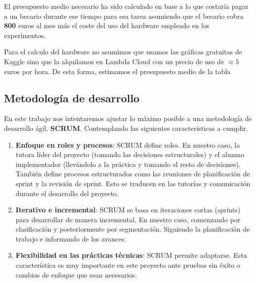 El presupuesto medio necesario ha sido calculado en base a lo que costaría pagar a un becario durante ese tiempo para esa tarea asumiendo que el becario cobra \textbf{800} euros al mes más el coste del uso del hardware empleado en los experimentos. 

Para el calculo del hardware no asumimos que usamos las gráficas gratuitas de Kaggle sino que la alquilamos en Lambda Cloud con un precio de uso de $\approx 5$ euros por hora. De esta forma, estimamos el presupuesto medio de la tabla 


\subsection{Metodología de desarrollo}

En este trabajo nos intentaremos ajustar lo máximo posible a una metodología de desarrollo ágil, \textbf{SCRUM}. Contemplando las siguientes características a cumplir.

\begin{enumerate}
	\item \textbf{Enfoque en roles y procesos}: SCRUM define roles. En nuestro caso, la tutora líder del proyecto (tomando las decisiones estructurales) y el alumno implementador (llevándolo a la práctica y tomando el resto de decisiones). También define procesos estructurados como las reuniones de planificación de sprint y la revisión de sprint. Esto se traducen en las tutorías y comunicación durante el desarrollo del proyecto.
	
	\item \textbf{Iterativo e incremental}: SCRUM se basa en iteraciones cortas (sprints) para desarrollar de manera incremental. En nuestro caso, comenzando por clasificación y posteriormente por segmentación. Siguiendo la planificación de trabajo e informando de los avances.
	
	\item \textbf{Flexibilidad en las prácticas técnicas}: SCRUM permite adaptarse. Esta característica es muy importante en este proyecto ante pruebas sin éxito o cambios de enfoque que sean necesarios.
\end{enumerate}